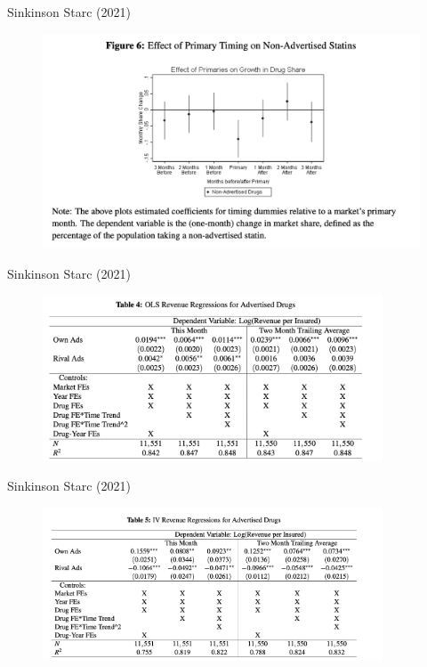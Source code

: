 \begin{frame}{Sinkinson Starc (2021)}
\begin{figure}
\centering
\includegraphics[height=\textheight]{./resources/ss_5.png}
\end{figure}
\end{frame}

\begin{frame}{Sinkinson Starc (2021)}
\begin{figure}
\centering
\includegraphics[width=0.9\textwidth]{./resources/ss_7.png}
\end{figure}
\end{frame}


\begin{frame}{Sinkinson Starc (2021)}
\begin{figure}
\centering
\includegraphics[width=0.9\textwidth]{./resources/ss_6.png}
\end{figure}
\end{frame}



